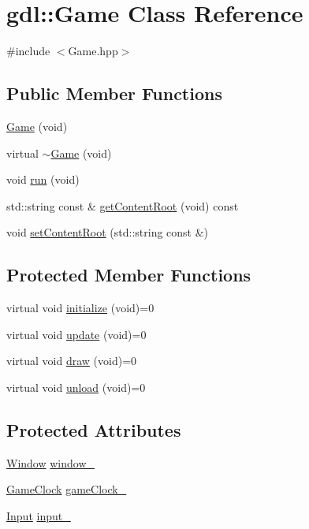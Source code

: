 \hypertarget{classgdl_1_1Game}{
\section{gdl::Game Class Reference}
\label{classgdl_1_1Game}
}


{\ttfamily \#include $<$Game.hpp$>$}\subsection*{Public Member Functions}
\begin{DoxyCompactItemize}
\item 
\hyperlink{classgdl_1_1Game_a6e82a8942734638e0f78f7308c0950fe}{Game} (void)
\item 
virtual \hyperlink{classgdl_1_1Game_a39acbe13be273b85570619bfff2f6135}{$\sim$Game} (void)
\item 
void \hyperlink{classgdl_1_1Game_aba4bb3b2f086d131a81ebe3de997938a}{run} (void)
\item 
std::string const \& \hyperlink{classgdl_1_1Game_ad487d5d6e94f2e4d7bcfaf57626d93d4}{getContentRoot} (void) const 
\item 
void \hyperlink{classgdl_1_1Game_a42bb8fd2de5376f6c864a998690da48d}{setContentRoot} (std::string const \&)
\end{DoxyCompactItemize}
\subsection*{Protected Member Functions}
\begin{DoxyCompactItemize}
\item 
virtual void \hyperlink{classgdl_1_1Game_a91948cfa194675d33b82c90eace878b2}{initialize} (void)=0
\item 
virtual void \hyperlink{classgdl_1_1Game_ad1a107e2c31850be6ee9df77e69d3714}{update} (void)=0
\item 
virtual void \hyperlink{classgdl_1_1Game_af09f81ba22b7c297fa2da73cd3fce8c5}{draw} (void)=0
\item 
virtual void \hyperlink{classgdl_1_1Game_a34061b97583826e39d08d7e1c85a3c4c}{unload} (void)=0
\end{DoxyCompactItemize}
\subsection*{Protected Attributes}
\begin{DoxyCompactItemize}
\item 
\hyperlink{classgdl_1_1Window}{Window} \hyperlink{classgdl_1_1Game_a0ff1750e43b4d276f64b25876b079bb4}{window\_\-}
\item 
\hyperlink{classgdl_1_1GameClock}{GameClock} \hyperlink{classgdl_1_1Game_a1cc7814ce34e89d8c09e6648640c5da8}{gameClock\_\-}
\item 
\hyperlink{classgdl_1_1Input}{Input} \hyperlink{classgdl_1_1Game_a43591b031a6f20da0cf41123efb8a26b}{input\_\-}
\end{DoxyCompactItemize}


